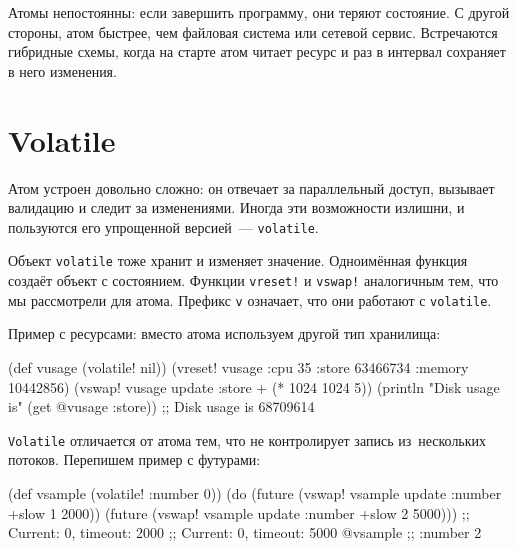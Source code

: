 
Атомы непостоянны: если завершить программу, они теряют состояние. С другой
стороны, атом быстрее, чем файловая система или сетевой сервис. Встречаются
гибридные схемы, когда на старте атом читает ресурс и раз в интервал сохраняет в
него изменения.

\section{Volatile}


Атом устроен довольно сложно: он отвечает за параллельный доступ, вызывает
валидацию и следит за изменениями. Иногда эти возможности излишни, и пользуются
его упрощенной версией~--- \verb|volatile|.


Объект \verb|volatile| тоже хранит и изменяет значение. Одноимённая функция
создаёт объект с состоянием. Функции \verb|vreset!| и \verb|vswap!|
аналогичным тем, что мы рассмотрели для атома. Префикс \verb|v| означает, что
они работают с \verb|volatile|.

Пример с ресурсами: вместо атома используем другой тип хранилища:

\begin{english}
  \begin{clojure}
(def vusage (volatile! nil))
(vreset! vusage
         {:cpu 35
          :store 63466734
          :memory 10442856})
(vswap! vusage update :store + (* 1024 1024 5))
(println "Disk usage is" (get @vusage :store))
;; Disk usage is 68709614
  \end{clojure}
\end{english}

\verb|Volatile| отличается от атома тем, что не контролирует запись
из~нескольких потоков. Перепишем пример с футурами:

\begin{english}
  \begin{clojure}
(def vsample (volatile! {:number 0}))
(do (future (vswap! vsample update :number +slow 1 2000))
    (future (vswap! vsample update :number +slow 2 5000)))
;; Current: 0, timeout: 2000
;; Current: 0, timeout: 5000
@vsample ;; {:number 2}
  \end{clojure}
\end{english}



